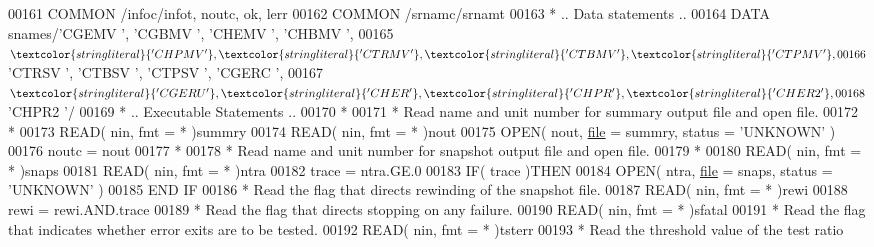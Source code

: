 \begin{DoxyCode}
00161       \textcolor{keyword}{COMMON}             /infoc/infot, noutc, ok, lerr
00162       \textcolor{keyword}{COMMON}             /srnamc/srnamt
00163 \textcolor{comment}{*     .. Data statements ..}
00164       \textcolor{keyword}{DATA}               snames/\textcolor{stringliteral}{'CGEMV '}, \textcolor{stringliteral}{'CGBMV '}, \textcolor{stringliteral}{'CHEMV '}, \textcolor{stringliteral}{'CHBMV '},
00165      $                   \textcolor{stringliteral}{'CHPMV '}, \textcolor{stringliteral}{'CTRMV '}, \textcolor{stringliteral}{'CTBMV '}, \textcolor{stringliteral}{'CTPMV '},
00166      $                   \textcolor{stringliteral}{'CTRSV '}, \textcolor{stringliteral}{'CTBSV '}, \textcolor{stringliteral}{'CTPSV '}, \textcolor{stringliteral}{'CGERC '},
00167      $                   \textcolor{stringliteral}{'CGERU '}, \textcolor{stringliteral}{'CHER  '}, \textcolor{stringliteral}{'CHPR  '}, \textcolor{stringliteral}{'CHER2 '},
00168      $                   \textcolor{stringliteral}{'CHPR2 '}/
00169 \textcolor{comment}{*     .. Executable Statements ..}
00170 \textcolor{comment}{*}
00171 \textcolor{comment}{*     Read name and unit number for summary output file and open file.}
00172 \textcolor{comment}{*}
00173       \textcolor{keyword}{READ}( nin, fmt = * )summry
00174       \textcolor{keyword}{READ}( nin, fmt = * )nout
00175       \textcolor{keyword}{OPEN}( nout, \hyperlink{structfile}{file} = summry, status = \textcolor{stringliteral}{'UNKNOWN'} )
00176       noutc = nout
00177 \textcolor{comment}{*}
00178 \textcolor{comment}{*     Read name and unit number for snapshot output file and open file.}
00179 \textcolor{comment}{*}
00180       \textcolor{keyword}{READ}( nin, fmt = * )snaps
00181       \textcolor{keyword}{READ}( nin, fmt = * )ntra
00182       trace = ntra.GE.0
00183       \textcolor{keywordflow}{IF}( trace )\textcolor{keywordflow}{THEN}
00184          \textcolor{keyword}{OPEN}( ntra, \hyperlink{structfile}{file} = snaps, status = \textcolor{stringliteral}{'UNKNOWN'} )
00185 \textcolor{keywordflow}{      END IF}
00186 \textcolor{comment}{*     Read the flag that directs rewinding of the snapshot file.}
00187       \textcolor{keyword}{READ}( nin, fmt = * )rewi
00188       rewi = rewi.AND.trace
00189 \textcolor{comment}{*     Read the flag that directs stopping on any failure.}
00190       \textcolor{keyword}{READ}( nin, fmt = * )sfatal
00191 \textcolor{comment}{*     Read the flag that indicates whether error exits are to be tested.}
00192       \textcolor{keyword}{READ}( nin, fmt = * )tsterr
00193 \textcolor{comment}{*     Read the threshold value of the test ratio}

\end{DoxyCode}
